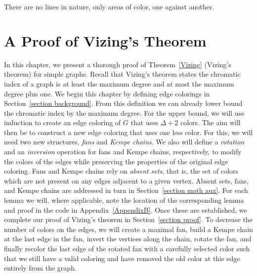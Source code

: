 \begin{savequote}[75mm]
There are no lines in nature, only areas of color, one against another.
\end{savequote}

\chapter{A Proof of Vizing's Theorem}\label{chapter math}
In this chapter, we present a thorough proof of Theorem~\ref{Vizing} (Vizing's theorem) for simple graphs. Recall that Vizing's theorem states the chromatic index of a graph is at least the maximum degree and at most the maximum degree plus one. We begin this chapter by defining edge colorings in Section~\ref{section background}. From this definition we can already lower bound the chromatic index by the maximum degree. For the upper bound, we will use induction to create an edge coloring of $G$ that uses $\Delta + 2$ colors. The aim will then be to construct a new edge coloring that uses one less color. For this, we will need two new structures, \textit{fans} and \textit{Kempe chains}. We also will define a \textit{rotation} and an \textit{inversion} operation for fans and Kempe chains, respectively, to modify the colors of the edges while preserving the properties of the original edge coloring. Fans and Kempe chains rely on \textit{absent sets}, that is, the set of colors which are not present on any edges adjacent to a given vertex. Absent sets, fans, and Kempe chains are addressed in turn in Section~\ref{section math aux}. For each lemma we will, where applicable, note the location of the corresponding lemma and proof in the code in Appendix~\ref{AppendixB}. Once these are established, we complete our proof of Vizing's theorem in Section~\ref{section proof}. To decrease the number of colors on the edges, we will create a maximal fan, build a Kempe chain at the last edge in the fan, invert the vertices along the chain, rotate the fan, and finally recolor the last edge of the rotated fan with a carefully selected color such that we still have a valid coloring and have removed the old color at this edge entirely from the graph.


